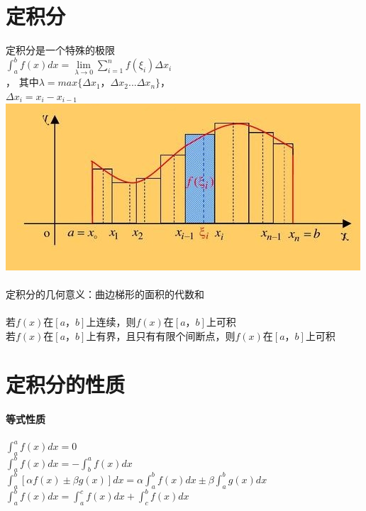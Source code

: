 \documentclass{article}
\begin{document}
\begin{flushleft}
	\LARGE
	
	\section{定积分}
	
	定积分是一个特殊的极限\\
	$\int_{a}^{b}f(x)dx=\lim\limits_{\lambda\to 0}\sum_{i=1}^{n}f(\xi_i)\Delta x_i$\\，
	其中$\lambda = max\{\Delta x_1， \Delta x_2...\Delta x_n\}$，\\
	$\Delta x_i=x_i-x_{i-1}$\\
	\includegraphics[scale=1.0]{2.jpg}\\
	~\\
	定积分的几何意义：曲边梯形的面积的代数和\\
	~\\
	若$f(x)$在$[a，b]$上连续，则$f(x)$在$[a，b]$上可积\\
	若$f(x)$在$[a，b]$上有界，且只有有限个间断点，则$f(x)$在$[a，b]$上可积\\
	
	\section{定积分的性质}
	
	\paragraph{等式性质}
	$\int_{a}^{a}f(x)dx=0$\\
	$\int_{a}^{b}f(x)dx=-\int_{b}^{a}f(x)dx$\\
	$\int_{a}^{b}[\alpha f(x)\pm \beta g(x)]dx=\alpha\int_{a}^{b}f(x)dx\pm \beta\int_{a}^{b}g(x)dx$\\
	$\int_{a}^{b}f(x)dx=\int_{a}^{c}f(x)dx+\int_{c}^{b}f(x)dx$\\

\end{flushleft}
\end{document}
